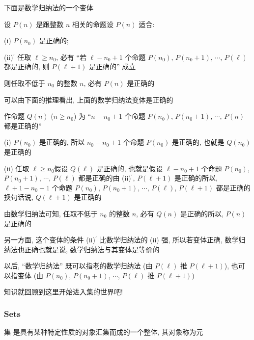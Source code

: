 下面是数学归纳法的一个变体\period

\begin{proposition}
    设 $P(n)$ 是跟整数 $n$ 相关的命题\period 设 $P(n)$ 适合:

    (i) $P(n_0)$ 是正确的;

    (ii)$^{\prime}$ 任取 $\ell \geq n_0$, 必有 ``若 $\ell - n_0 + 1$ 个命题 $P(n_0)$, $P(n_0 + 1)$, $\cdots$, $P(\ell)$ 都是正确的, 则 $P(\ell + 1)$ 是正确的'' 成立\period

    则任取不低于 $n_0$ 的整数 $n$, 必有 $P(n)$ 是正确的\period
\end{proposition}

\begin{remark}
    可以由下面的推理看出, 上面的数学归纳法变体是正确的\period

    作命题 $Q(n)$ ($n \geq n_0$) 为 ``$n - n_0 + 1$ 个命题 $P(n_0)$, $P(n_0 + 1)$, $\cdots$, $P(n)$ 都是正确的''\period

    (i) $P(n_0)$ 是正确的, 所以 $n_0 - n_0 + 1$ 个命题 $P(n_0)$ 是正确的, 也就是 $Q(n_0)$ 是正确的\period

    (ii) 任取 $\ell \geq n_0$\period 假设 $Q(\ell)$ 是正确的, 也就是假设 $\ell - n_0 + 1$ 个命题 $P(n_0)$, $P(n_0 + 1)$, $\cdots$, $P(\ell)$ 都是正确的\period 由 (ii)$^{\prime}$, $P(\ell + 1)$ 是正确的\period 所以, $\ell + 1 - n_0 + 1$ 个命题 $P(n_0)$, $P(n_0 + 1)$, $\cdots$, $P(\ell)$, $P(\ell + 1)$ 都是正确的\period 换句话说, $Q(\ell + 1)$ 是正确的\period

    由数学归纳法可知, 任取不低于 $n_0$ 的整数 $n$, 必有 $Q(n)$ 是正确的\period 所以, $P(n)$ 是正确的\period

    另一方面, 这个变体的条件 (ii)$^{\prime}$ 比数学归纳法的 (ii) 强, 所以若变体正确, 数学归纳法也正确\period 也就是说, 数学归纳法与其变体是等价的\period

    以后, ``数学归纳法'' 既可以指老的数学归纳法 (由 $P(\ell)$ 推 $P(\ell+1)$), 也可以指变体 (由 $P(n_0)$, $P(n_0 + 1)$, $\cdots$, $P(\ell)$ 推 $P(\ell+1)$)\period
\end{remark}

知识就回顾到这里\period 开始进入集的世界吧!

\subsubsection*{Sets}

\begin{definition}
    集  是具有某种特定性质的对象汇集而成的一个整体, 其对象称为元 \period
\end{definition}

